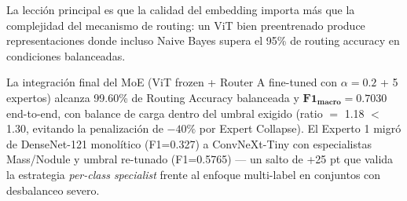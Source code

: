 \documentclass[11pt, a4paper]{article}
\begin{document}
La lección principal es que la calidad del embedding importa más que la
complejidad del mecanismo de routing: un ViT bien preentrenado produce
representaciones donde incluso Naive Bayes supera el 95\% de routing
accuracy en condiciones balanceadas.

La integración final del MoE (ViT frozen + Router A fine-tuned con
$\alpha=0.2$ + 5 expertos) alcanza 99.60\% de Routing Accuracy balanceada
y $\mathbf{F1_{\text{macro}} = 0.7030}$ end-to-end, con balance de carga
dentro del umbral exigido (ratio $=$ 1.18 $<$ 1.30, evitando la
penalización de $-40\%$ por Expert Collapse). El Experto 1 migró de
DenseNet-121 monolítico (F1=0.327) a ConvNeXt-Tiny con especialistas
Mass/Nodule y umbral re-tunado (F1=0.5765) — un salto de +25 pt que valida
la estrategia \textit{per-class specialist} frente al enfoque multi-label
en conjuntos con desbalanceo severo.
\end{document}
